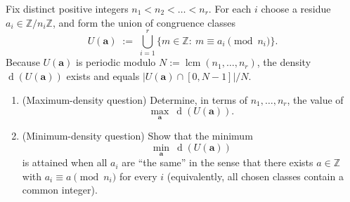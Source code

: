 Fix distinct positive integers $n_1<n_2<\dots<n_r$. For each $i$ choose a residue
$a_i\in \mathbb{Z}/n_i\mathbb{Z}$, and form the union of congruence classes
\[
U(\mathbf a)\;:=\;\bigcup_{i=1}^r \{m\in \mathbb{Z}:\ m\equiv a_i \pmod{n_i}\}.
\]
Because $U(\mathbf a)$ is periodic modulo $N:=\operatorname{lcm}(n_1,\dots,n_r)$, the density
$\operatorname{d}(U(\mathbf a))$ exists and equals $|U(\mathbf a)\cap[0,N-1]|/N$.

\begin{enumerate}
\item (Maximum-density question) Determine, in terms of $n_1,\dots,n_r$, the value of
\[
\max_{\mathbf a}\ \operatorname{d}(U(\mathbf a)).
\]
\item (Minimum-density question) Show that the minimum
\[
\min_{\mathbf a}\ \operatorname{d}(U(\mathbf a))
\]
is attained when all $a_i$ are ``the same'' in the sense that there exists $a\in\mathbb{Z}$
with $a_i\equiv a\pmod{n_i}$ for every $i$ (equivalently, all chosen classes contain a common integer).
\end{enumerate}
